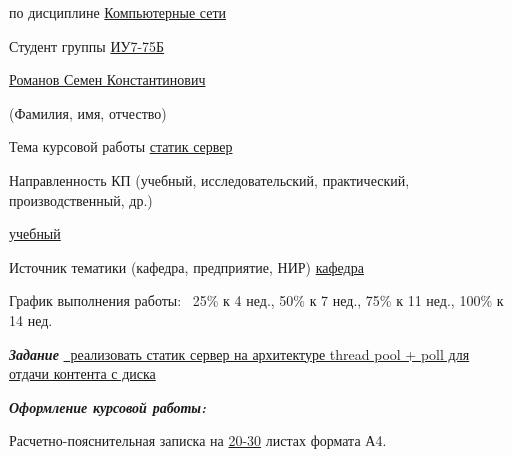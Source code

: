 \begin{flushleft}
	\fontsize{12pt}{0.6cm}\selectfont
	
	по дисциплине \uline{\hfill Компьютерные сети\hfill}
	
	Студент группы \uline{ИУ7-75Б}
	
	\centerline{\uline{\hfill Романов Семен Константинович\hfill}}
	\scriptsize\mbox{\hspace{7cm}}(Фамилия, имя, отчество)
	
	\fontsize{12pt}{0.6cm}\selectfont
	
	\fontsize{12pt}{0.5\baselineskip}\selectfont
	Тема курсовой работы {\uline{\hfill статик сервер\hfill}}
	
	
	Направленность КП (учебный, исследовательский, практический, производственный, др.)\hfill\centerline{\uline{\hfill учебный \hfill}}
	
	Источник тематики (кафедра, предприятие, НИР) {\uline{\hfill кафедра \hfill}}
	
	\fontsize{12pt}{0.6\baselineskip}\selectfont
	График выполнения работы: ~25\% к 4 нед., 50\% к 7 нед., 75\% к 11 нед., 100\% к 14 нед.
	
	\addvspace{8pt}
	\fontsize{12pt}{0.5\baselineskip}\selectfont
	\textit{\bfseries{Задание}} 
	\uline{~реализовать статик сервер на архитектуре thread pool + poll для отдачи контента с диска\hfill}
	
	\addvspace{6pt}
	
	\textit{\bfseries{Оформление курсовой работы:}}
	
	\fontsize{12pt}{0.1cm}\selectfont
	Расчетно-пояснительная записка на \uline{20-30} листах формата А4.
\end{flushleft}

\vspace*{-0.3cm}


